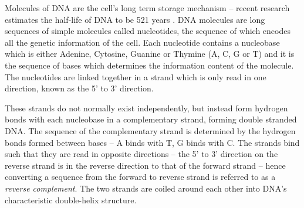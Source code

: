 Molecules of DNA are the cell's long term storage mechanism -- recent research
estimates the half-life of DNA to be 521 years \citep{DNAhalflife}.
DNA molecules are long sequences of simple molecules called nucleotides, the
sequence of  which encodes all the genetic information of the cell.
Each nucleotide contains a nucleobase which is either Adenine, Cytosine, 
Guanine or Thymine (A, C, G or T) and it is the sequence of bases 
which determines the information content of the molecule.
The nucleotides are linked together in a strand which is only read in one 
direction, known as the 5' to 3' direction.

These strands do not normally exist independently, but instead form hydrogen
bonds with each nucleobase in a complementary strand, forming double stranded
DNA.
The sequence of the complementary strand is determined by the hydrogen bonds
formed between bases -- A binds with T, G binds with C.
The strands bind such that they are read in opposite directions -- the 5' to 3' 
direction on the reverse strand is in the reverse direction to that of the 
forward strand -- hence converting a sequence from the
forward to reverse strand is referred to as a \emph{reverse complement}.
The two strands are coiled around each other into DNA's characteristic 
double-helix structure.

